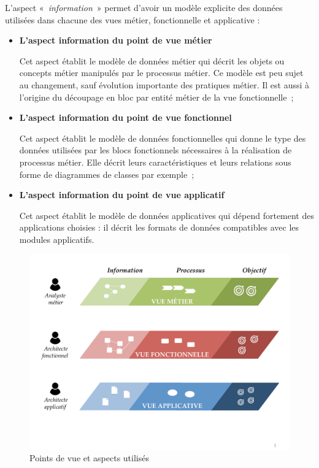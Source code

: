 L'aspect «~\textit{information}~» permet d'avoir un
modèle explicite des données utilisées dans chacune des vues métier,
fonctionnelle et applicative : \begin{itemize} \item \textbf{L'aspect
information du point de vue métier}

 Cet aspect établit le modèle de données métier qui décrit les objets ou
concepts métier manipulés par le processus métier. Ce modèle est peu sujet au
changement, sauf évolution importante des pratiques métier. Il est aussi à
l'origine du découpage en bloc par entité métier de la vue fonctionnelle~; \item
\textbf{L'aspect information du point de vue fonctionnel}

Cet aspect établit le modèle de données fonctionnelles qui donne le type des
données utilisées par les blocs fonctionnels nécessaires à la réalisation de
processus métier. Elle décrit leurs caractéristiques et leurs relations sous
forme de diagrammes de classes par exemple~;

    \item \textbf{L'aspect information du point de vue applicatif}

Cet aspect établit le modèle de données applicatives qui dépend fortement
des applications choisies : il décrit les formats de données compatibles avec
les modules applicatifs. \end{itemize}

\begin{figure}[!ht]
    \begin{center}
    \includegraphics[trim= 0cm 3cm 0cm 0cm, width=1\textwidth]{figures/4_demarche/vue_aspect.pdf}
    \end{center}
    \caption{Points de vue et aspects utilisés} \label{fig:vue_aspect}
\end{figure}

